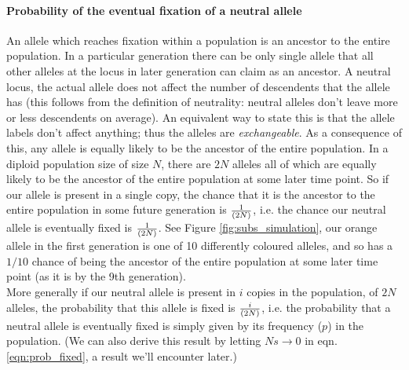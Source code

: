 

\paragraph{Probability of the eventual fixation of a neutral allele}
An allele which reaches fixation within a population is an ancestor to the
entire population. In a particular generation there can be only single allele
that all other alleles at the locus in later generation can claim as an
ancestor. A neutral locus, the actual allele does not affect the number of
descendents that the allele has (this follows from the definition of
neutrality: neutral alleles don't leave more or less descendents on average).
An equivalent way to state this is that the allele labels don't affect
anything; thus the alleles are \emph{exchangeable}. As a consequence of this,
any allele is equally likely to be the ancestor of the entire population.  In a
diploid population size of size $N$, there are $2N$ alleles all of which are
equally likely to be the ancestor of the entire population at some later time
point. So if our allele is present in a single copy, the chance that it is the
ancestor to the entire population in some future generation is
$\nicefrac{1}{(2N)}$, i.e. the chance our neutral allele is eventually fixed is
$\nicefrac{1}{(2N)}$.  See Figure \ref{fig:subs_simulation}, our orange allele
in the first generation is one of 10 differently coloured alleles, and so has a
$1/10$ chance of being the ancestor of the entire population at some later time
point (as it is by the 9th generation).\\

More generally if our neutral allele is present in $i$ copies in the
population, of $2N$ alleles, the probability that this allele is fixed is
$\nicefrac{i}{(2N)}$, i.e. the probability that a neutral allele is eventually
fixed is simply given by its frequency ($p$) in the population.  (We can also
derive this result by letting $Ns \rightarrow 0$ in eqn.
\eqref{eqn:prob_fixed}, a result we'll encounter later.)

